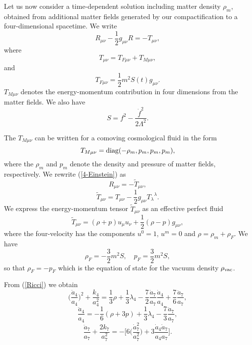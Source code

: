 \documentclass[a4paper,12pt]{article}
\begin{document}
Let us now consider a time-dependent solution
including matter density $\rho_m$, obtained from additional matter fields generated
by our compactification to a four-dimensional spacetime. We write
\begin{equation}
\label{4-Einstein}
R_{\mu\nu}-\frac{1}{2}g_{\mu\nu}R=-T_{\mu\nu},
\end{equation}
where
\begin{equation}
T_{\mu\nu}=T_{F\mu\nu}+T_{M\mu\nu},
\end{equation}
and
\begin{equation}
T_{F\mu\nu}=\frac{1}{2}m^2S(t)g_{\mu\nu}.
\end{equation}
$T_{M\mu\nu}$ denotes the energy-momentum
contribution in four dimensions from the matter fields.
We also have
\begin{equation}
S=f^2-\frac{{\dot f}^2}{2\Lambda^2}.
\end{equation}

The $T_{M\mu\nu}$ can be written for a comoving cosmological
fluid in the form
\begin{equation}
T_{M\mu\nu}={\rm diag}(-\rho_m, p_m, p_m, p_m),
\end{equation}
where the $\rho_m$ and $p_m$ denote the density and pressure of matter fields,
respectively. We rewrite (\ref{4-Einstein}) as
\begin{equation}
R_{\mu\nu}=-{\tilde T}_{\mu\nu},
\end{equation}
\begin{equation}
{\tilde
T}_{\mu\nu}=T_{\mu\nu}-\frac{1}{2}g_{\mu\nu}{T_\lambda}^\lambda.
\end{equation} We express the energy-momentum tensor ${\tilde
T}_{\mu\nu}$ as an effective perfect fluid
\begin{equation}
{\tilde T}_{\mu\nu}=(\rho+p)u_\mu
u_\nu+\frac{1}{2}(\rho-p)g_{\mu\nu},
\end{equation}
where the
four-velocity has the components $u^0=1$, $u^m=0$ and
$\rho=\rho_m+\rho_F$. We have
\begin{equation}
\rho_F=-\frac{3}{2}m^2S,\quad p_F=\frac{3}{2}m^2S,
\end{equation}
so that $\rho_F=-p_F$ which is the equation of state for the vacuum density
$\rho_{\rm vac}$.

From (\ref{Ricci}) we obtain
\begin{equation}
\label{modfriedmann}
\biggl(\frac{{\dot a}_4}{a_4}\biggr)^2+\frac{k_4}{a_4^2}
=\frac{1}{3}\rho+\frac{1}{3}\lambda_4-\frac{7}{2}\frac{{\dot
a}_7}{a_7}\frac{{\dot a}_4}{a_4} +\frac{7}{6}\frac{{\ddot
a}_7}{a_7}, \end{equation}
\begin{equation}
\label{acceleration}
\frac{{\ddot a}_4}{a_4}
=-\frac{1}{6}(\rho+3p)+\frac{1}{3}\lambda_4-\frac{7}{3}\frac{{\ddot
a_7}}{a_7}, \end{equation}
\begin{equation}
\frac{{\ddot a}_7}
{a_7}+\frac{2k_7}{a_7^2}
=-\biggl[6\biggl(\frac{{\dot a}_7^2}{a_7^2}\biggr)
+3\frac{{\dot a}_4{\dot
a}_7}{a_4a_7}\biggr].
\end{equation}
\end{document}
